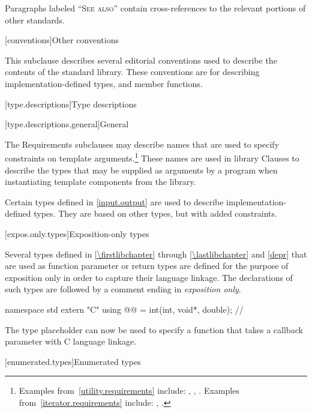 \pnum
Paragraphs labeled ``\textsc{See also}'' contain cross-references to the relevant portions
of other standards.

[conventions]{Other conventions}
%

\pnum
This subclause describes several editorial conventions used to describe the contents
of the \Cpp{} standard library.
These conventions are for describing
implementation-defined types,
and member functions.

[type.descriptions]{Type descriptions}

[type.descriptions.general]{General}

\pnum
The Requirements subclauses may describe names that are used to specify
constraints on template arguments.\footnote{Examples
from~\ref{utility.requirements} include:
,
,
.
Examples from~\ref{iterator.requirements} include:
,
.}
These names are used in library Clauses
to describe the types that
may be supplied as arguments by a \Cpp{} program when instantiating template components from
the library.

\pnum
Certain types defined in \ref{input.output} are used to describe implementation-defined types.
%
They are based on other types, but with added constraints.

[expos.only.types]{Exposition-only types}

\pnum
Several types defined in \ref{\firstlibchapter} through \ref{\lastlibchapter}
and \ref{depr} that are used as function parameter or return types are defined
for the purpose of exposition only in order to capture their language linkage. The
declarations of such types are followed by a comment ending in \textit{exposition only}.
\begin{example}
\begin{codeblock}
namespace std {
  extern "C" using @@ = int(int, void*, double);  // \expos
}
\end{codeblock}
The type placeholder  can now be used to specify a function
that takes a callback parameter with C language linkage.
\end{example}

[enumerated.types]{Enumerated types}

